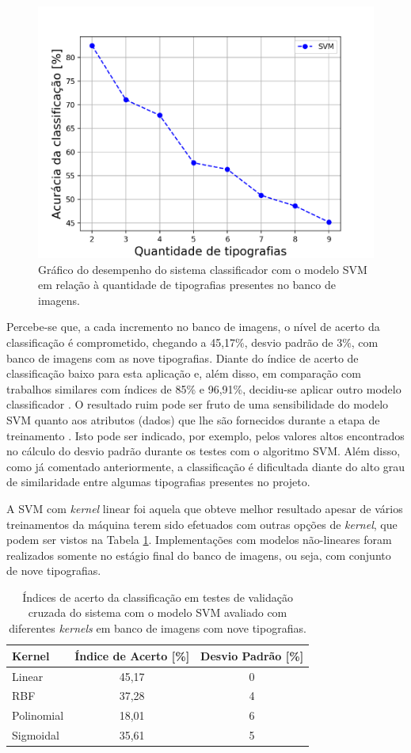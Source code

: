 
\begin{figure}[H]
 \centering
  \includegraphics[width=0.7\linewidth]{figuras/graficosvm.pdf}
  \caption{Gráfico do desempenho do sistema classificador com o modelo SVM em relação à quantidade de tipografias presentes no banco de imagens.}
  \label{fig:graficoSVM}
\end{figure}

Percebe-se que, a cada incremento no banco de imagens, o nível de acerto da classificação é comprometido, chegando a 45,17\%, desvio padrão de 3\%, com banco de imagens com as nove tipografias. Diante do índice de acerto de classificação baixo para esta aplicação e, além disso, em comparação com trabalhos similares com índices de 85\% e 96,91\%, decidiu-se aplicar outro modelo classificador  . O resultado ruim pode ser fruto de uma sensibilidade do modelo SVM quanto aos atributos (dados) que lhe são fornecidos durante a etapa de treinamento . Isto pode ser indicado, por exemplo, pelos valores altos encontrados no cálculo do desvio padrão durante os testes com o algoritmo SVM. Além disso, como já comentado anteriormente, a classificação é dificultada diante do alto grau de similaridade entre algumas tipografias presentes no projeto.

A SVM com \textit{kernel} linear foi aquela que obteve melhor resultado apesar de vários treinamentos da máquina terem sido efetuados com outras opções de \textit{kernel}, que podem ser vistos na Tabela \ref{tab:svmkernelResults}. Implementações com modelos não-lineares foram realizados somente no estágio final do banco de imagens, ou seja, com conjunto de nove tipografias.

\begin{table}[h]
 \centering
 \begin{tabular}{l|c|c}
    Kernel & Índice de Acerto [\%] & Desvio Padrão [\%]\\
	\hline
	Linear &  45,17 & 0 \\
	RBF & 37,28 & 4 \\
	Polinomial & 18,01 & 6  \\
	Sigmoidal & 35,61 & 5 \\
 \end{tabular}
 \caption{Índices de acerto da classificação em testes de validação cruzada do sistema com o modelo SVM avaliado com diferentes \textit{kernels} em banco de imagens com nove tipografias.}
 \label{tab:svmkernelResults}
\end{table}

